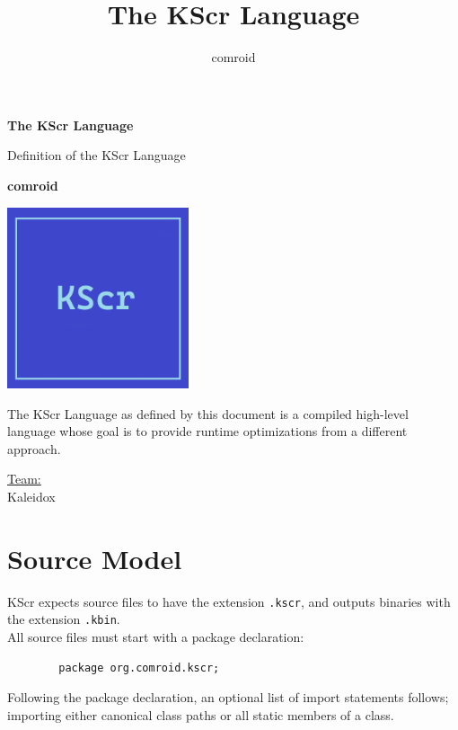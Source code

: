 \documentclass{docs}
\begin{document}
    \title{The KScr Language}
    \author{comroid}
    \begin{titlepage}
        \begin{center}
            \vspace*{1cm}
            
            \Huge
            \textbf{The KScr Language}
            
            \vspace{0.5cm}
            \LARGE
            Definition of the KScr Language
            
            \vspace{1.5cm}
            
            \textbf{comroid}
            
            \vspace{0.8cm}
            
            \includegraphics[width=0.4\textwidth]{img/kscr-icon.png}
            
            \vfill
            
            The KScr Language as defined by this document is a compiled high-level language whose goal is to provide runtime optimizations from a different approach.
            
            \vspace{1.2cm}
            
            \Large
            \underline{Team:} \\
            Kaleidox
        \end{center}
    \end{titlepage}
    \tableofcontents
    
    \pagebreak
    \section{Source Model}
    KScr expects source files to have the extension \texttt{.kscr}, and outputs binaries with the extension \texttt{.kbin}.
    \\
    All source files must start with a package declaration:
    \begin{verbatim}
        package org.comroid.kscr;
    \end{verbatim}
    Following the package declaration, an optional list of import statements follows; importing either canonical class paths or all static members of a class.
    
\end{document}
